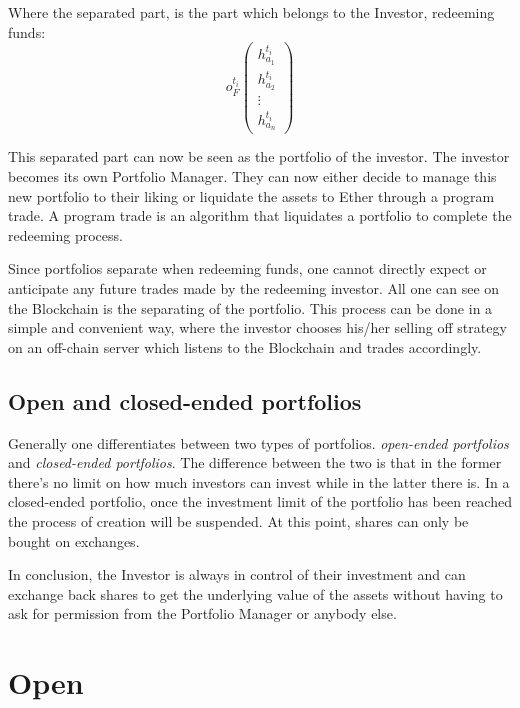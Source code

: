 \documentclass[9pt,oneside]{amsart}
\theoremstyle{plain}
\begin{document}
\begin{multicols}{2}
Where the separated part, is the part which belongs to the Investor, redeeming funds:
\begin{equation*}
	o_{F}^{t_i}
	\begin{pmatrix}
		h_{a_{1}}^{t_i}\\
		h_{a_{2}}^{t_i}\\
		\vdots \\
		h_{a_{n}}^{t_i}
	\end{pmatrix}
\end{equation*}

This separated part can now be seen as the portfolio of the investor. The investor becomes its own Portfolio Manager. They can now either decide to manage this new portfolio to their liking or liquidate the assets to Ether through a program trade. A program trade is an algorithm that liquidates a portfolio to complete the redeeming process.

Since portfolios separate when redeeming funds, one cannot directly expect or anticipate any future trades made by the redeeming investor. All one can see on the Blockchain is the separating of the portfolio. This process can be done in a simple and convenient way, where the investor chooses his/her selling off strategy on an off-chain server which listens to the Blockchain and trades accordingly.

\subsection{Open and closed-ended portfolios}\label{sub:closed}

Generally one differentiates between two types of portfolios. \textit{open-ended portfolios} and \textit{closed-ended portfolios}. The difference between the two is that in the former there's no limit on how much investors can invest while in the latter there is. In a closed-ended portfolio, once the investment limit of the portfolio has been reached the process of creation will be suspended. At this point, shares can only be bought on exchanges.

In conclusion, the Investor is always in control of their investment and can exchange back shares to get the underlying value of the assets without having to ask for permission from the Portfolio Manager or anybody else.

\section{Open}\label{sec:open}


\end{multicols}
\end{document}
